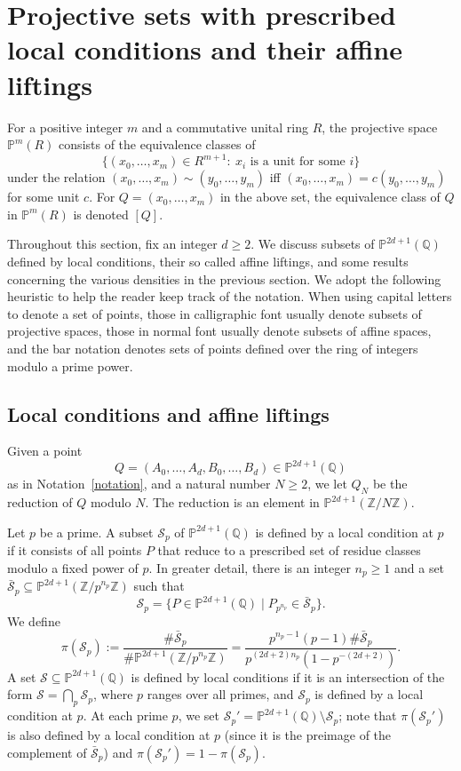 \documentclass[12pt]{amsart}
\newcommand{\Z}{\mathbb{Z}}
\newcommand{\Q}{\mathbb{Q}}
\newcommand{\cS}{\mathcal{S}}
\numberwithin{equation}{section}
\begin{document}
\section{Projective sets with prescribed local conditions and their affine liftings}\label{s 3}

For a positive integer $m$ and a commutative unital ring $R$, the projective space $\mathbb{P}^m(R)$ consists of the equivalence classes of
$$\{(x_0,\dots,x_m)\in R^{m+1}:\ \text{$x_i$ is a unit for some $i$}\}$$
under the relation $(x_0,\dots,x_m)\sim (y_0,\dots,y_m)$ iff 
$(x_0,\dots,x_m)=c(y_0,\dots,y_m)$ for some unit $c$. For $Q=(x_0,\dots,x_m)$ in the above set, the equivalence class of $Q$ in 
$\mathbb{P}^m(R)$ is denoted $[Q]$.

Throughout this section, fix an integer $d\geq 2$. We discuss subsets of
$\mathbb{P}^{2d+1}(\Q)$ defined by local conditions, their so called affine liftings, and some results concerning the various densities in the previous section.
We adopt the following heuristic to help the reader keep track of the notation. When using capital letters to denote a set of points, those in calligraphic font usually denote subsets of projective spaces, those in normal font usually denote subsets of affine spaces, and the bar notation denotes sets of points defined over the ring of integers modulo a prime power.

\subsection{Local conditions and affine liftings} 
\par  Given a point \[Q=(A_0, \dots, A_d, B_0, \dots, B_d)\in \mathbb{P}^{2d+1}(\Q)\] as in Notation~\ref{notation}, and a natural number $N\geq 2$, we let $Q_N$ be the reduction of $Q$ modulo $N$. The reduction is an element in $\mathbb{P}^{2d+1}(\Z/N\Z)$. 

Let $p$ be a prime. A subset $\mathcal{S}_p$ of $\mathbb{P}^{2d+1}(\Q)$ is defined by a local condition at $p$ if it consists of all points $P$ that reduce to a prescribed set of residue classes modulo a fixed power of $p$. In greater detail, there is an integer $n_p\geq 1$ and a set $\bar{\mathcal{S}}_p\subseteq \mathbb{P}^{2d+1}\left(\Z/p^{n_p} \Z\right)$ such that \[\mathcal{S}_p=\{P\in \mathbb{P}^{2d+1}(\Q)\mid P_{p^{n_p}}\in \bar{\mathcal{S}}_p\}.\]
We define 
\begin{equation}\label{eq:picSp definition}
\pi(\mathcal{S}_p):=\frac{\# \bar{\mathcal{S}}_p}{\# \mathbb{P}^{2d+1}\left(\Z/p^{n_p}\Z \right)}=\frac{p^{n_p-1}(p-1)\# \bar{\mathcal{S}}_p}{p^{(2d+2)n_p}\left(1-p^{-(2d+2)}\right)}.
\end{equation}
A set $\cS\subseteq \mathbb{P}^{2d+1}(\Q)$ is defined by local conditions if it is an intersection of the form $\cS=\bigcap_p \cS_p$, where $p$ ranges over all primes, and $\cS_p$ is defined by a local  condition at $p$. At each prime $p$, we set $\cS_p'=\mathbb{P}^{2d+1}(\Q)\setminus \cS_p$; note that $\pi(\cS_p')$ is also defined by a local condition at $p$ (since it is the preimage of 
the complement of $\bar{\mathcal{S}}_p$) and $\pi(\cS_p')=1-\pi(\cS_p)$.
\end{document}
